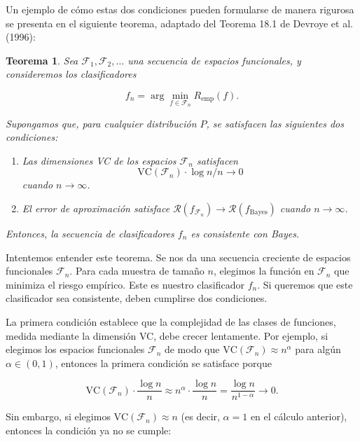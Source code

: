 \documentclass{report}
\newtheorem{thm}{Teorema}[section]
\begin{document}
Un ejemplo de cómo estas dos condiciones pueden formularse de manera rigurosa se presenta en el 
siguiente teorema, adaptado del Teorema 18.1 de Devroye et al. (1996):\newline

\begin{thm}
 Sea \(\mathcal{F}_1, \mathcal{F}_2, \dots\) una secuencia de espacios funcionales, y 
consideremos los clasificadores 

\[
f_n = \arg\min_{f \in \mathcal{F}_n} R_{\text{emp}}(f).
\]

Supongamos que, para cualquier distribución \(P\), se satisfacen las siguientes dos condiciones:

\begin{enumerate}
    \item Las dimensiones VC de los espacios \(\mathcal{F}_n\) satisfacen 
    \[
    \text{VC}(\mathcal{F}_n) \cdot \log n / n \to 0
    \]
    cuando \(n \to \infty\).
    
    \item El error de aproximación satisface \(\mathcal{R}(f_{\mathcal{F}_n}) \to \mathcal{R}(f_{\text{Bayes}})\) 
    cuando \(n \to \infty\).
\end{enumerate}

Entonces, la secuencia de clasificadores \(f_n\) es consistente con Bayes.

\end{thm}
\vspace{0.3cm}

Intentemos entender este teorema. Se nos da una secuencia creciente de espacios funcionales \(\mathcal{F}_n\). 
Para cada muestra de tamaño \(n\), elegimos la función en \(\mathcal{F}_n\) que minimiza el riesgo empírico. 
Este es nuestro clasificador \(f_n\). Si queremos que este clasificador sea consistente, deben cumplirse dos 
condiciones.\newline

La primera condición establece que la complejidad de las clases de funciones, medida mediante la dimensión VC, 
debe crecer lentamente. Por ejemplo, si elegimos los espacios funcionales \(\mathcal{F}_n\) de modo que 
\(\text{VC}(\mathcal{F}_n) \approx n^\alpha\) para algún \(\alpha \in (0,1)\), entonces la primera condición 
se satisface porque

\[
\text{VC}(\mathcal{F}_n) \cdot \frac{\log n}{n} \approx n^\alpha \cdot \frac{\log n}{n} = \frac{\log n}{n^{1-\alpha}} \to 0.
\]

Sin embargo, si elegimos \(\text{VC}(\mathcal{F}_n) \approx n\) (es decir, \(\alpha = 1\) en el cálculo anterior), 
entonces la condición ya no se cumple:
\end{document}
